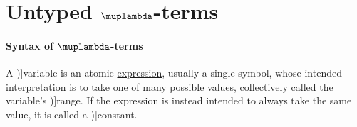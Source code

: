 \section{Untyped \texorpdfstring{\( \muplambda \)}{λ}-terms}\label{sec:untyped_lambda_terms}

\paragraph{Syntax of \( \muplambda \)-terms}

\begin{concept}\label{con:variable}
  A \term[en=variable (\cite[9]{Church1956LogicVol1})]{variable} is an atomic \hyperref[con:expression]{expression}, usually a single symbol, whose intended interpretation is to take one of many possible values, collectively called the variable's \term[en=range (\cite[9]{Church1956LogicVol1})]{range}. If the expression is instead intended to always take the same value, it is called a \term[en=constant (\cite[9]{Church1956LogicVol1})]{constant}.
\end{concept}
